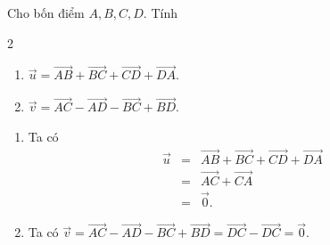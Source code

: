 \begin{bt}%
	Cho bốn điểm $A,B,C,D$. Tính
	\begin{multicols}{2}
		\begin{enumerate}
			\item $\overrightarrow{u}=\overrightarrow{AB}+\overrightarrow{BC}+\overrightarrow{CD}+\overrightarrow{DA}$.
			\item $\overrightarrow{v}=\overrightarrow{AC}-\overrightarrow{AD}-\overrightarrow{BC}+\overrightarrow{BD}$.
		\end{enumerate}
	\end{multicols}
	\loigiai
	{
		\begin{enumerate}
			\item 	Ta có
			\allowdisplaybreaks
			\begin{eqnarray*}
			\overrightarrow{u}&=&	\overrightarrow{AB}+\overrightarrow{BC}+\overrightarrow{CD}+\overrightarrow{DA}\\
				&=&\overrightarrow{AC}+\overrightarrow{CA}\\
				&=&\overrightarrow{0}.
			\end{eqnarray*}
			\item
			Ta có $\overrightarrow{v}=\overrightarrow{AC}-\overrightarrow{AD}-\overrightarrow{BC}+\overrightarrow{BD} =\overrightarrow{DC}-\overrightarrow{DC}=\overrightarrow{0}$.
		\end{enumerate}
		
	}
\end{bt}

